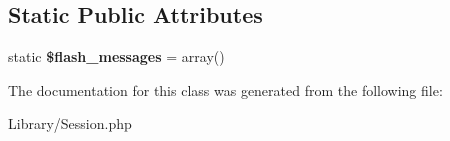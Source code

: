 \subsection*{Static Public Attributes}
\begin{DoxyCompactItemize}
\item 
\hypertarget{class_session_a5bacf7bbae287dfd28fbaad90f463720}{static {\bfseries \$flash\-\_\-messages} = array()}\label{class_session_a5bacf7bbae287dfd28fbaad90f463720}

\end{DoxyCompactItemize}


The documentation for this class was generated from the following file\-:\begin{DoxyCompactItemize}
\item 
Library/Session.\-php\end{DoxyCompactItemize}
